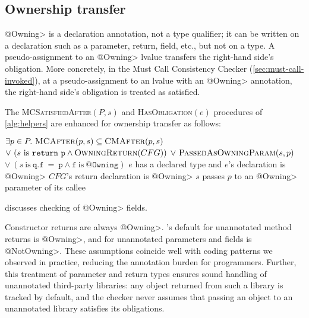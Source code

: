 \subsection{Ownership transfer}
\label{sec:ownership-transfer}

\<@Owning> is a declaration annotation, not a type qualifier; it can be
written on a declaration such as a parameter, return, field, etc., but not
on a type.
A pseudo-assignment to an \<@Owning> lvalue transfers the right-hand side's
\MustCall obligation.
More concretely, in the Must Call Consistency Checker
(\cref{sec:must-call-invoked}), at a pseudo-assignment to an lvalue with
an \<@Owning> annotation, the right-hand side's
\MustCall obligation is treated as satisfied.

The \textsc{MCSatisfiedAfter}$(P,s)$ and \textsc{HasObligation}$(e)$ procedures 
of \cref{alg:helpers} are enhanced for ownership transfer as follows:
\begin{algorithmic}
  \State \Return $\exists p \in P .\ \textsc{MCAfter}(p,s) \subseteq \textsc{CMAfter}(p,s)$ \newline
  \hspace*{6em} $\vee\ (s \mathrm{\ is\ } \mathtt{return\ p} \wedge \textsc{OwningReturn}(CFG))$ \newline
  \hspace*{6em} $\vee\ \textsc{PassedAsOwningParam}(s,p)$\newline
  \hspace*{6em} $\vee\ (s \mathrm{\ is\ } \mathtt{q.f\ =\ p} \wedge \mathtt{f} \mathrm{\ is\ } \mathtt{@Owning})$
  \EndProcedure
  \State \Return $e$ has a declared \MustCall type and $e$'s declaration is \<@Owning>
  \EndProcedure
  \State \Return $CFG$'s return declaration is \<@Owning>
  \EndProcedure
  \State \Return $s$ passes $p$ to an \<@Owning> parameter of its callee
  \EndProcedure
\end{algorithmic}
 discusses checking of \<@Owning> fields.

Constructor returns are always \<@Owning>.
\Tool's default for unannotated method returns is \<@Owning>,
and for unannotated parameters and fields is \<@NotOwning>.  These assumptions
coincide well with coding patterns we observed in practice, reducing the
annotation burden for programmers.  Further, this treatment of parameter and
return types ensures sound handling of unannotated third-party libraries: any
object returned from such a library is tracked by default, and the checker
never assumes that passing an object to an unannotated library satisfies its obligations.

